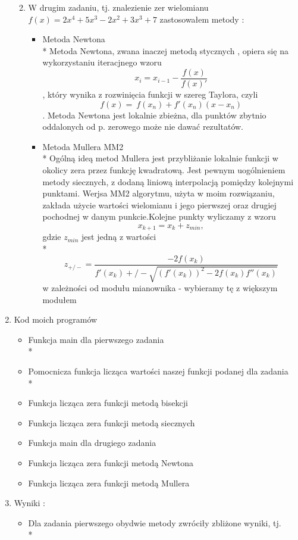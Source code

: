 \documentclass[a4paper, 11pt]{article}
\begin{document}
\begin{enumerate}
\begin{enumerate}
\begin{itemize}
\end{itemize}
\item W drugim zadaniu, tj. znalezienie zer wielomianu \( f(x) = 2x^4 + 5x^3 - 2x^2 +3x^3 +7 \) zastosowałem metody : 
\begin{itemize}
 \item Metoda Newtona \\* Metoda Newtona, zwana inaczej metodą stycznych , opiera się na wykorzystaniu iteracjnego wzoru \[ x_i = x_{i-1} - \dfrac{f(x)}{f(x)'} \] , który wynika z rozwinięcia funkcji w szereg Taylora, czyli  \[f(x) =~f(x_n) +f'(x_n)(x-x_n) \] . Metoda Newtona jest lokalnie zbieżna, dla punktów zbytnio oddalonych od p. zerowego może nie dawać rezultatów.
\item Metoda Mullera MM2 \\* Ogólną ideą metod Mullera jest przybliżanie lokalnie funkcji w okolicy zera przez funkcję kwadratową. Jest pewnym uogólnieniem metody siecznych, z dodaną liniową interpolacją pomiędzy kolejnymi punktami. Werjsa MM2 algorytmu, użyta w moim rozwiązaniu, zakłada użycie wartości wielomianu i jego pierwszej oraz drugiej pochodnej w danym punkcie.Kolejne punkty wyliczamy z wzoru \[ x_{k+1} = x_k + z_{min} , \] gdzie \(z_{min}\) jest jedną z wartości  \\* \[ z_{+/-} = \dfrac{-2f(x_k)}{f'(x_k) +/- \sqrt{(f'(x_k))^2 - 2f(x_k)f''(x_k)}} \] w zależności od modułu mianownika - wybieramy tę z większym modułem
\end{itemize}
\end{enumerate}

\item Kod moich programów 
\begin{itemize}
\item Funkcja main dla pierwszego zadania \\*

\item Pomocnicza funkcja licząca wartości naszej funkcji podanej dla zadania \\*
 
 \item Funkcja licząca zera funkcji metodą bisekcji
 
 \item Funkcja licząca zera funkcji metodą siecznych
 
  \item Funkcja main dla drugiego zadania
 
   \item Funkcja licząca zera funkcji metodą Newtona
 
   \item Funkcja licząca zera funkcji metodą Mullera
 
\end{itemize}
\item
Wyniki : 
\begin{itemize}
\item  Dla zadania pierwszego obydwie metody zwróciły zbliżone wyniki, tj.\\*
\begin{center}


\end{center}
\end{itemize}
\end{enumerate}
\end{document}
